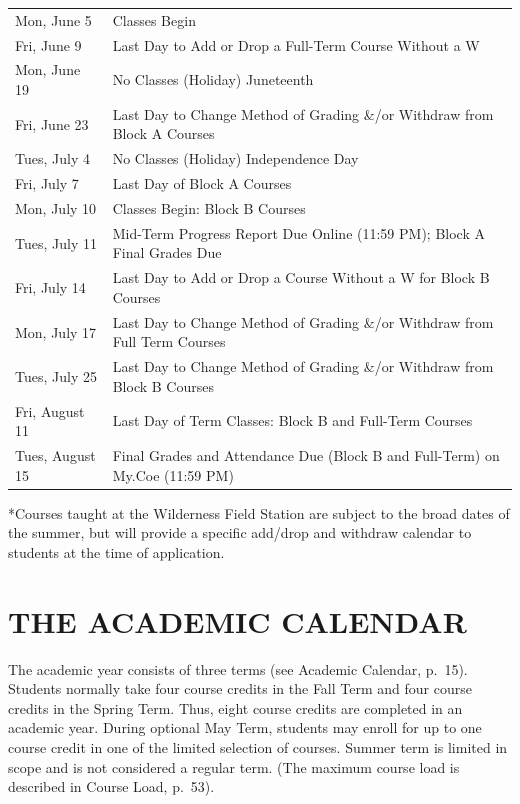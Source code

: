 \documentclass[
  letterpaper,
]{scrbook}
\renewcommand\toprule[2]\relax
\renewcommand\bottomrule[2]\relax
\begin{document}
\begin{longtable}[]{@{}
  >{\raggedright\arraybackslash}p{}
  >{\raggedleft\arraybackslash}p{}@{}}
\toprule\noalign{}
\endhead
\bottomrule\noalign{}
\endlastfoot
Mon, June 5 & Classes Begin \\
Fri, June 9 & Last Day to Add or Drop a Full-Term Course Without a W \\
Mon, June 19 & No Classes (Holiday) Juneteenth \\
Fri, June 23 & Last Day to Change Method of Grading \&/or Withdraw from
Block A Courses \\
Tues, July 4 & No Classes (Holiday) Independence Day \\
Fri, July 7 & Last Day of Block A Courses \\
Mon, July 10 & Classes Begin: Block B Courses \\
Tues, July 11 & Mid-Term Progress Report Due Online (11:59 PM); Block A
Final Grades Due \\
Fri, July 14 & Last Day to Add or Drop a Course Without a W for Block B
Courses \\
Mon, July 17 & Last Day to Change Method of Grading \&/or Withdraw from
Full Term Courses \\
Tues, July 25 & Last Day to Change Method of Grading \&/or Withdraw from
Block B Courses \\
Fri, August 11 & Last Day of Term Classes: Block B and Full-Term
Courses \\
Tues, August 15 & Final Grades and Attendance Due (Block B and
Full-Term) on My.Coe (11:59 PM) \\
\end{longtable}

*Courses taught at the Wilderness Field Station are subject to the broad
dates of the summer, but will provide a specific add/drop and withdraw
calendar to students at the time of application.

\hypertarget{the-academic-calendar}{%
\chapter*{THE ACADEMIC CALENDAR}\label{the-academic-calendar}}


The academic year consists of three terms (see Academic Calendar,
p.~15). Students normally take four course credits in the Fall Term and
four course credits in the Spring Term. Thus, eight course credits are
completed in an academic year. During optional May Term, students may
enroll for up to one course credit in one of the limited selection of
courses. Summer term is limited in scope and is not considered a regular
term. (The maximum course load is described in Course Load, p.~53).
\end{document}
